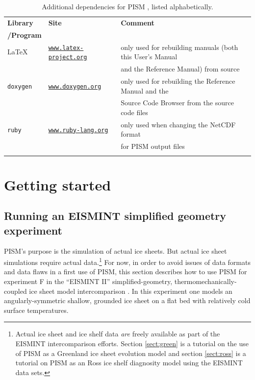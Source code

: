 \documentclass[11pt,final]{amsart}
\renewcommand{\t}[1]{\texttt{#1}}
\begin{document}
\begin{table}[ht]
\caption{Additional dependencies for PISM , listed alphabetically.  }\label{tab:PISMdepends_superdev}
\small
\begin{tabular}{@{}llll}\hline
\textbf{Library} & \textbf{Site} & \textbf{Comment} \\
\textbf{/Program} &  &  &  \\ \hline
\LaTeX & \href{http://www.latex-project.org/}{\t{www.latex-project.org}} & only used for rebuilding manuals (both this User's Manual  \\
 &  & and the Reference Manual) from source \\
\texttt{doxygen} & \href{http://www.stack.nl/~dimitri/doxygen/}{\t{www.doxygen.org}} & only used for rebuilding the Reference Manual and the \\
 & & Source Code Browser from the source code files \\
\texttt{ruby} & \href{http://www.ruby-lang.org/en/}{\texttt{www.ruby-lang.org}} & only used when changing the NetCDF format \\
 &  & for PISM output files \\
\hline
\normalsize
\end{tabular}
\end{table}


\clearpage\newpage
\section{Getting started}\label{sect:start}

\subsection{Running an EISMINT simplified geometry experiment}  PISM's purpose is the simulation of actual ice sheets.  But actual ice sheet simulations require actual data.\footnote{Actual ice sheet and ice shelf data \emph{are} freely available as part of the EISMINT intercomparison efforts.  Section \ref{sect:green} is a tutorial on the use of PISM as a Greenland ice sheet evolution model and section \ref{sect:ross} is a tutorial on PISM as an Ross ice shelf diagnosity model using the EISMINT data sets.}  For now, in order to avoid issues of data formats and data flaws in a first use of PISM, this section describes how to use PISM for experiment F in the ``EISMINT II'' simplified-geometry, thermomechanically-coupled ice sheet model intercomparison \cite{EISMINT00}.  In this experiment one models an angularly-symmetric shallow, grounded ice sheet on a flat bed with relatively cold surface temperatures.
\end{document}
